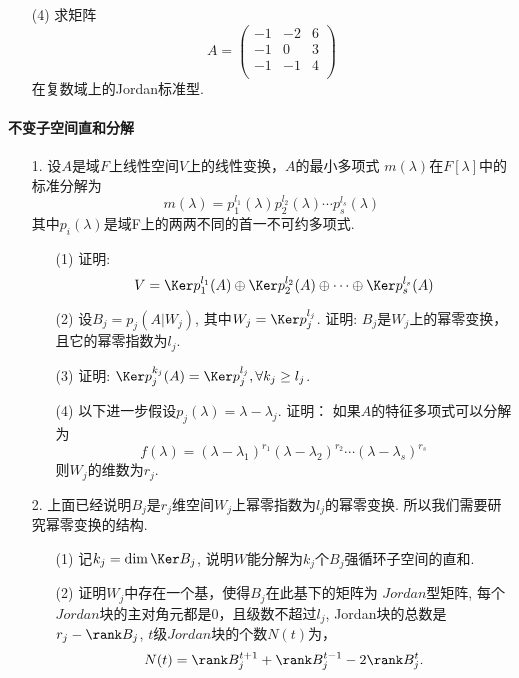 \begin{itemize}
\begin{itemize}
    \item [(4)]
    求矩阵
    \begin{equation}
    \nonumber
    A = 
    \begin{pmatrix}
    -1 & -2& 6\\
    -1 &  0& 3\\
    -1 & -1& 4\\
    \end{pmatrix}
    \end{equation}
    在复数域上的Jordan标准型.
    \vspace{3cm}
    \end{itemize}
\end{itemize}

\paragraph{不变子空间直和分解}
\begin{itemize}
    \item [1.] 设$A$是域$F$上线性空间$V$上的线性变换，$A$的最小多项式
    $m(\lambda)$在$F[\lambda]$中的标准分解为
    $$m(\lambda) = p_1^{l_1}(\lambda)p_2^{l_2}(\lambda)\cdots p_s^{l_s}(\lambda)$$
    其中$p_i(\lambda)$是域F上的两两不同的首一不可约多项式.
    \begin{itemize}
        \item [(1)] 证明: 
        $$V = \Ker p_1^{l_1}(A) \oplus \Ker p_2^{l_2}(A) \oplus \cdots \oplus \Ker p_s^{l_s}(A)$$
        \vspace{2cm}
        \item [(2)] 设$B_j = p_j(A|W_j)$, 其中$W_j = \Ker p_{j}^{l_j}$.
        证明: $B_j$是$W_j$上的幂零变换，且它的幂零指数为$l_j$.
        \vspace{3cm}
        \item [(3)] 证明: $\Ker p_j^{k_j}(A) = \Ker p_{j}^{l_j}, \forall k_j \ge l_j$.
        \vspace{3cm}
        \item [(4)] 以下进一步假设$p_j(\lambda) = \lambda - \lambda_j$. 证明：
        如果$A$的特征多项式可以分解为
        $$f(\lambda) = (\lambda-\lambda_1)^{r_1}(\lambda - \lambda_2)^{r_2}\cdots
        (\lambda-\lambda_s)^{r_s}$$
        则$W_j$的维数为$r_j$.
        \vspace{3cm}
    \end{itemize}
    \item [2.] 上面已经说明$B_j$是$r_j$维空间$W_j$上幂零指数为$l_j$的幂零变换. 所以我们需要研究幂零变换的结构.
    \begin{itemize}
        \item [(1)] 记$k_j = \dim \Ker B_j$, 说明$W$能分解为$k_j$个$B_j$强循环子空间的直和.
        \vspace{3cm}
        \item [(2)] 证明$W_j$中存在一个基，使得$B_j$在此基下的矩阵为
        $Jordan$型矩阵, 每个$Jordan$块的主对角元都是0，且级数不超过$l_j$,
        Jordan块的总数是$r_j-\rank B_j$, $t$级$Jordan$块的个数$N(t)$为，
        $$N(t) = \rank B_j^{t+1} + \rank B_j^{t-1} - 2 \rank B_j^t.$$
        \vspace{3cm}
    \end{itemize}
\end{itemize}

